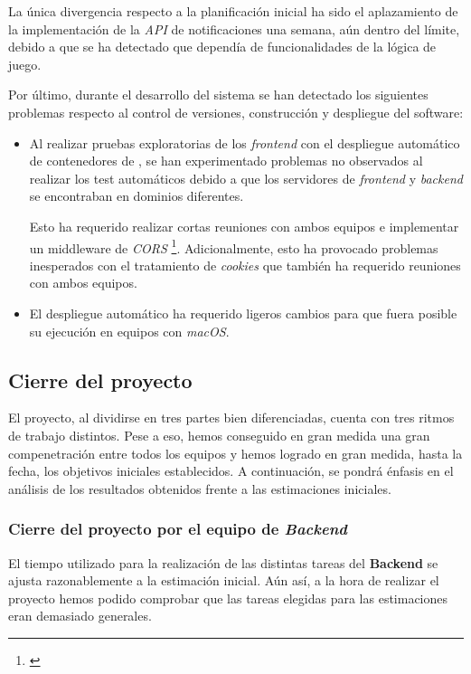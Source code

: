 \documentclass[11pt, a4paper, titlepage]{article}
\begin{document}
La única divergencia respecto a la planificación inicial ha sido el aplazamiento de la implementación de la \textit{API} de notificaciones una semana, aún dentro del límite, debido a que se ha detectado que dependía de funcionalidades de la lógica de juego. \\

\newpage

Por último, durante el desarrollo del sistema se han detectado los siguientes problemas respecto al control de versiones, construcción y despliegue del software:
\begin{itemize}
    \item Al realizar pruebas exploratorias de los \textit{frontend} con el despliegue automático de contenedores de , se han experimentado problemas no observados al realizar los test automáticos debido a que los servidores de \textit{frontend} y \textit{backend} se encontraban en dominios diferentes.

    Esto ha requerido realizar cortas reuniones con ambos equipos e implementar un middleware de \textit{CORS} \footnote{\href{https://developer.mozilla.org/en-US/docs/Web/HTTP/CORS}{}}. Adicionalmente, esto ha provocado problemas inesperados con el tratamiento de \textit{cookies} que también ha requerido reuniones con ambos equipos.

    \item El despliegue automático ha requerido ligeros cambios para que fuera posible su ejecución en equipos con \textit{macOS}.
\end{itemize}
\subsection{Cierre del proyecto}

El proyecto, al dividirse en tres partes bien diferenciadas, cuenta con tres ritmos de trabajo distintos. Pese a eso, hemos conseguido en gran medida una gran compenetración entre todos los equipos y hemos logrado en gran medida, hasta la fecha, los objetivos iniciales establecidos. A continuación, se pondrá énfasis en el análisis de los resultados obtenidos frente a las estimaciones iniciales. \\

\subsubsection{Cierre del proyecto por el equipo de \textit{Backend}}
El tiempo utilizado para la realización de las distintas tareas del \textbf{Backend} se ajusta razonablemente a la estimación inicial.
Aún así, a la hora de realizar el proyecto hemos podido comprobar que las tareas elegidas para las estimaciones eran demasiado generales.\\
\end{document}
